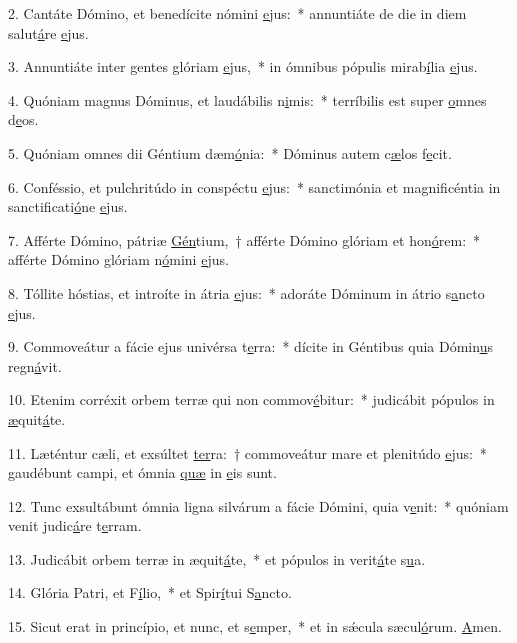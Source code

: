 2. Cantáte Dómino, et benedícite nómini \uline{e}jus:~* annuntiáte de die in diem salut\uline{á}re \uline{e}jus.\par 
3. Annuntiáte inter gentes glóriam \uline{e}jus,~* in ómnibus pópulis mirab\uline{í}lia \uline{e}jus.\par 
4. Quóniam magnus Dóminus, et laudábilis n\uline{i}mis:~* terríbilis est super \uline{o}mnes d\uline{e}os.\par 
5. Quóniam omnes dii Géntium dæm\uline{ó}nia:~* Dóminus autem c\uline{æ}los f\uline{e}cit.\par 
6. Conféssio, et pulchritúdo in conspéctu \uline{e}jus:~* sanctimónia et magnificéntia in sanctificati\uline{ó}ne \uline{e}jus.\par 
7. Afférte Dómino, pátriæ \uline{Gén}tium,~† afférte Dómino glóriam et hon\uline{ó}rem:~* afférte Dómino glóriam n\uline{ó}mini \uline{e}jus.\par 
8. Tóllite hóstias, et introíte in átria \uline{e}jus:~* adoráte Dóminum in átrio s\uline{a}ncto \uline{e}jus.\par 
9. Commoveátur a fácie ejus univérsa t\uline{e}rra:~* dícite in Géntibus quia Dómin\uline{u}s regn\uline{á}vit.\par 
10. Etenim corréxit orbem terræ qui non commov\uline{é}bitur:~* judicábit pópulos in \uline{æ}quit\uline{á}te.\par 
11. Læténtur cæli, et exsúltet \uline{ter}ra:~† commoveátur mare et plenitúdo \uline{e}jus:~* gaudébunt campi, et ómnia \uline{quæ} in \uline{e}is sunt.\par 
12. Tunc exsultábunt ómnia ligna silvárum a fácie Dómini, quia v\uline{e}nit:~* quóniam venit judic\uline{á}re t\uline{e}rram.\par 
13. Judicábit orbem terræ in æquit\uline{á}te,~* et pópulos in verit\uline{á}te s\uline{u}a.\par 
14. Glória Patri, et F\uline{í}lio,~* et Spir\uline{í}tui S\uline{a}ncto.\par 
15. Sicut erat in princípio, et nunc, et s\uline{e}mper,~* et in sǽcula sæcul\uline{ó}rum. \uline{A}men.\par 
